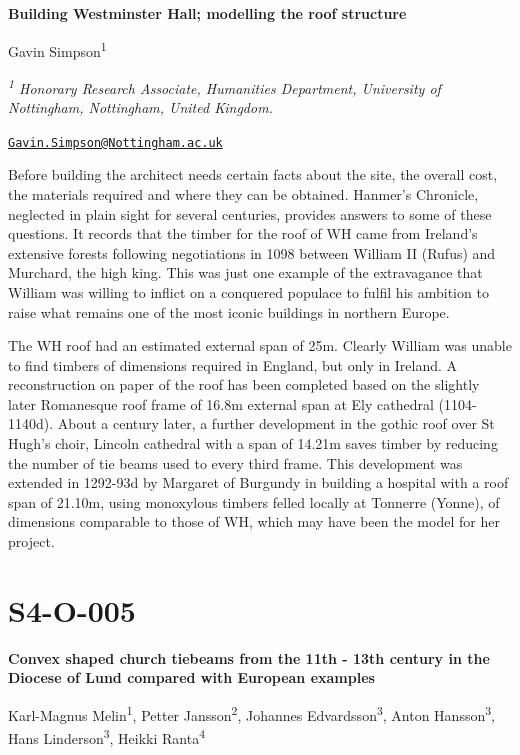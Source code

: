 \documentclass[
]{book}
\begin{document}
\textbf{Building Westminster Hall; modelling the roof structure}

Gavin Simpson\textsuperscript{1}

\emph{\textsuperscript{1} Honorary Research Associate, Humanities Department, University of Nottingham, Nottingham, United Kingdom.}

\href{mailto:Gavin.Simpson@Nottingham.ac.uk}{\nolinkurl{Gavin.Simpson@Nottingham.ac.uk}}

Before building the architect needs certain facts about the site, the overall cost, the materials required and where they can be obtained. Hanmer's Chronicle, neglected in plain sight for several centuries, provides answers to some of these questions. It records that the timber for the roof of WH came from Ireland's extensive forests following negotiations in 1098 between William II (Rufus) and Murchard, the high king. This was just one example of the extravagance that William was willing to inflict on a conquered populace to fulfil his ambition to raise what remains one of the most iconic buildings in northern Europe.

The WH roof had an estimated external span of 25m. Clearly William was unable to find timbers of dimensions required in England, but only in Ireland. A reconstruction on paper of the roof has been completed based on the slightly later Romanesque roof frame of 16.8m external span at Ely cathedral (1104-1140d). About a century later, a further development in the gothic roof over St Hugh's choir, Lincoln cathedral with a span of 14.21m saves timber by reducing the number of tie beams used to every third frame. This development was extended in 1292-93d by Margaret of Burgundy in building a hospital with a roof span of 21.10m, using monoxylous timbers felled locally at Tonnerre (Yonne), of dimensions comparable to those of WH, which may have been the model for her project.

\hypertarget{s4-o-005}{%
\section*{S4-O-005}\label{s4-o-005}}

\textbf{Convex shaped church tiebeams from the 11th - 13th century in the Diocese of Lund compared with European examples}

Karl-Magnus Melin\textsuperscript{1}, Petter Jansson\textsuperscript{2}, Johannes Edvardsson\textsuperscript{3}, Anton Hansson\textsuperscript{3}, Hans Linderson\textsuperscript{3}, Heikki Ranta\textsuperscript{4}
\end{document}
